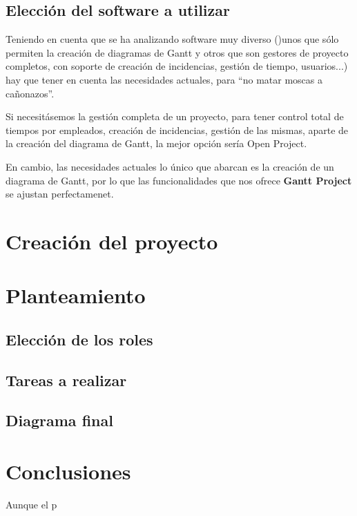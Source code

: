 \documentclass{\ClassPath/viu-tfm-template}
\begin{document}
\section{Elección del software a utilizar}
Teniendo en cuenta que se ha analizando software muy diverso ()unos que sólo permiten la creación de diagramas de Gantt y otros que son gestores de proyecto completos, con soporte de creación de incidencias, gestión de tiempo, usuarios...) hay que tener en cuenta las necesidades actuales, para “no matar moscas a cañonazos”.

Si necesitásemos la gestión completa de un proyecto, para tener control total de tiempos por empleados, creación de incidencias, gestión de las mismas, aparte de la creación del diagrama de Gantt, la mejor opción sería Open Project.

En cambio, las necesidades actuales lo único que abarcan es la creación de un diagrama de Gantt, por lo que las funcionalidades que nos ofrece \textbf{Gantt Project} se ajustan perfectamenet.


\chapter{Creación del proyecto}

\chapter{Planteamiento}

\section{Elección de los roles}

\section{Tareas a realizar}

\section{Diagrama final}



\chapter{Conclusiones}

Aunque el p
\end{document}
